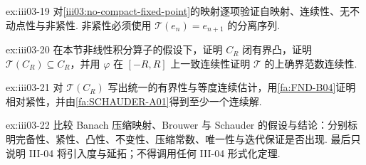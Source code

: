 \begin{FAExercise}{ex:iii03-19}
对\autoref{iii03:no-compact-fixed-point}的映射逐项验证自映射、连续性、无不动点性与非紧性. 非紧性必须使用 \(\displaystyle \mathcal T(e_n)=e_{n+1}\) 的分离序列.
\end{FAExercise}

\begin{FAExercise}[积分算子的连续性与不变球]{ex:iii03-20}
在本节非线性积分算子的假设下，证明 \(\displaystyle C_R\) 闭有界凸，证明 \(\displaystyle \mathcal T(C_R)\subseteq C_R\)，并用 \(\displaystyle \varphi\) 在 \(\displaystyle[-R,R]\) 上一致连续性证明 \(\displaystyle \mathcal T\) 的上确界范数连续性.
\end{FAExercise}

\begin{FAExercise}{ex:iii03-21}
对 \(\displaystyle \mathcal T(C_R)\) 写出统一的有界性与等度连续估计，用\autoref{fa:FND-B04}证明相对紧性，并由\autoref{fa:SCHAUDER-A01}得到至少一个连续解.
\end{FAExercise}

\begin{FAExercise}[三种机制与后续度边界]{ex:iii03-22}
比较 Banach 压缩映射、Brouwer 与 Schauder 的假设与结论：分别标明完备性、紧性、凸性、不变性、压缩常数、唯一性与迭代保证是否出现. 最后只说明 III-04 将引入度与延拓；不得调用任何 III-04 形式化定理.
\end{FAExercise}
